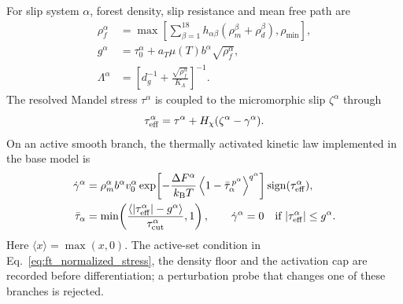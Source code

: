 For slip system $\alpha$, forest density, slip resistance and mean free path are
\begin{align}
 \rho_f^\alpha
 &=\max\!\left[\sum_{\beta=1}^{18}
 h_{\alpha\beta}(\rho_m^\beta+\rho_d^\beta),\rho_{\min}\right],
 \label{eq:ft_forest_density}\\
 g^\alpha
 &=\tau_0^\alpha+a_T\mu(T)b^\alpha\sqrt{\rho_f^\alpha},
 \label{eq:ft_slip_resistance}\\
 \Lambda^\alpha
 &=\left[d_g^{-1}+\frac{\sqrt{\rho_f^\alpha}}{K_\Lambda}\right]^{-1}.
 \label{eq:ft_mean_free_path}
\end{align}
The resolved Mandel stress $\tau^\alpha$ is coupled to the micromorphic slip $\zeta^\alpha$ through
\begin{equation}
 \tau_{\rm eff}^\alpha
 =\tau^\alpha+H_\chi(\zeta^\alpha-\gamma^\alpha).
 \label{eq:ft_effective_slip_stress}
\end{equation}
On an active smooth branch, the thermally activated kinetic law implemented in the base model is
\begin{align}
 \dot\gamma^\alpha
 &=\rho_m^\alpha b^\alpha v_0^\alpha
 \exp\!\left[-\frac{\Delta F^\alpha}{k_{\rm B}T}
 \left\langle1-\bar\tau_\alpha^{\,p^\alpha}\right\rangle^{q^\alpha}\right]
 \operatorname{sign}(\tau_{\rm eff}^\alpha),
 \label{eq:ft_slip_rate}\\
 \bar\tau_\alpha
 &=\min\!\left(
 \frac{\langle|\tau_{\rm eff}^\alpha|-g^\alpha\rangle}
 {\tau_{\rm cut}^\alpha},1\right),
 \qquad
 \dot\gamma^\alpha=0\quad\text{if }|\tau_{\rm eff}^\alpha|\le g^\alpha .
 \label{eq:ft_normalized_stress}
\end{align}
Here $\langle x\rangle=\max(x,0)$. The active-set condition in Eq.~\eqref{eq:ft_normalized_stress}, the density floor and the activation cap are recorded before differentiation; a perturbation probe that changes one of these branches is rejected.

